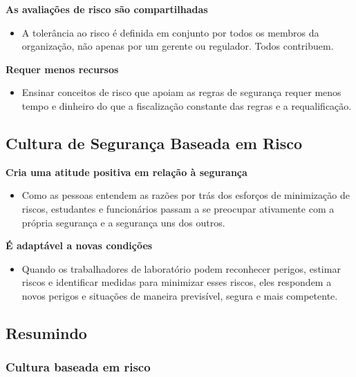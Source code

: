 \documentclass[
  letterpaper,
  DIV=11,
  numbers=noendperiod]{scrartcl}
\providecommand{\tightlist}{%
  \setlength{\itemsep}{0pt}\setlength{\parskip}{0pt}}\usepackage{longtable,booktabs,array}
\begin{document}
\textbf{As avaliações de risco são compartilhadas}

\begin{itemize}
\tightlist
\item
  A tolerância ao risco é definida em conjunto por todos os membros da
  organização, não apenas por um gerente ou regulador. Todos contribuem.
\end{itemize}

\textbf{Requer menos recursos}

\begin{itemize}
\tightlist
\item
  Ensinar conceitos de risco que apoiam as regras de segurança requer
  menos tempo e dinheiro do que a fiscalização constante das regras e a
  requalificação.
\end{itemize}

\subsection{Cultura de Segurança Baseada em
Risco}\label{cultura-de-seguranuxe7a-baseada-em-risco-1}

\textbf{Cria uma atitude positiva em relação à segurança}

\begin{itemize}
\tightlist
\item
  Como as pessoas entendem as razões por trás dos esforços de
  minimização de riscos, estudantes e funcionários passam a se preocupar
  ativamente com a própria segurança e a segurança uns dos outros.
\end{itemize}

\textbf{É adaptável a novas condições}

\begin{itemize}
\tightlist
\item
  Quando os trabalhadores de laboratório podem reconhecer perigos,
  estimar riscos e identificar medidas para minimizar esses riscos, eles
  respondem a novos perigos e situações de maneira previsível, segura e
  mais competente.
\end{itemize}

\subsection{Resumindo}\label{resumindo}

\subsubsection{Cultura baseada em risco}\label{cultura-baseada-em-risco}
\end{document}
